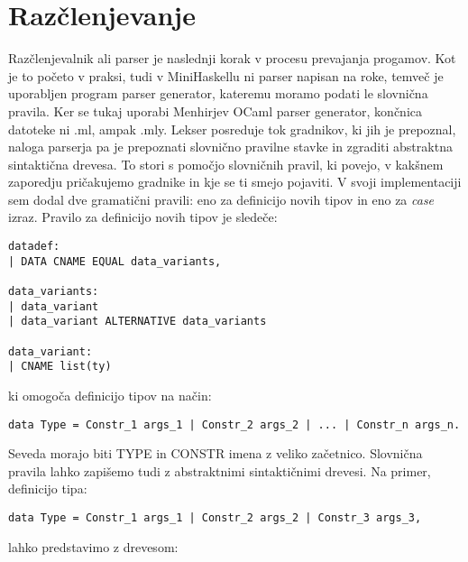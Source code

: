\documentclass[12pt,a4paper,openany]{book}
\begin{document}
\section{Razčlenjevanje}
Razčlenjevalnik ali parser je naslednji korak v procesu prevajanja progamov. Kot je to početo v praksi, tudi v MiniHaskellu ni parser napisan na roke, temveč 
je uporabljen program parser generator, kateremu moramo podati le slovnična pravila. Ker se tukaj uporabi Menhirjev OCaml parser generator, končnica 
datoteke ni .ml, ampak .mly. Lekser posreduje tok gradnikov, ki jih je prepoznal, naloga parserja pa je prepoznati slovnično pravilne stavke in zgraditi 
abstraktna sintaktična drevesa. To stori s pomočjo slovničnih pravil, ki povejo, v kakšnem zaporedju pričakujemo gradnike in kje se ti smejo pojaviti. 
V svoji implementaciji sem dodal dve gramatični pravili: eno za definicijo novih tipov in eno za \emph{case} izraz. Pravilo za definicijo novih tipov je 
sledeče:
\begin{lstlisting}
datadef:
| DATA CNAME EQUAL data_variants,

data_variants:
| data_variant
| data_variant ALTERNATIVE data_variants

data_variant:
| CNAME list(ty)
\end{lstlisting}
ki omogoča definicijo tipov na način:
\begin{lstlisting}
data Type = Constr_1 args_1 | Constr_2 args_2 | ... | Constr_n args_n.
\end{lstlisting}
Seveda morajo biti TYPE in CONSTR imena z veliko začetnico. Slovnična pravila lahko zapišemo tudi z abstraktnimi sintaktičnimi drevesi. Na primer, 
definicijo tipa:
\begin{lstlisting}
data Type = Constr_1 args_1 | Constr_2 args_2 | Constr_3 args_3,
\end{lstlisting}
lahko predstavimo z drevesom:
\begin{center}
\end{center}
\end{document}
